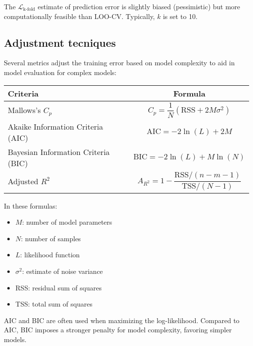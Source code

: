 The $\mathcal{L}_{\text{k-fold}}$ estimate of prediction error is slightly biased (pessimistic) but more computationally feasible than LOO-CV. 
Typically, $k$ is set to 10.

\subsection{Adjustment tecniques}
Several metrics adjust the training error based on model complexity to aid in model evaluation for complex models:
\renewcommand*{\arraystretch}{2}
\begin{table}[H]
    \centering
    \begin{tabular}{|l|c|}
        \hline
        \textbf{Criteria} & \textbf{Formula} \\ \hline
        Mallows's $C_p$ & $C_p=\dfrac{1}{N}\left( \text{RSS}+2M\sigma^2 \right)$ \\ \hline
        Akaike Information Criteria (AIC) & $\text{AIC}=-2\ln(L)+2M$ \\ \hline
        Bayesian Information Criteria (BIC) & $\text{BIC}=-2\ln(L)+M\ln(N)$ \\ \hline
        Adjusted $R^2$ & $A_{R^2}=1-\dfrac{\text{RSS}/(n-m-1)}{\text{TSS}/(N-1)}$ \\ \hline
    \end{tabular}
\end{table}
\renewcommand*{\arraystretch}{1}
In these formulas:
\begin{itemize}
    \item $M$: number of model parameters
    \item $N$: number of samples
    \item $L$: likelihood function
    \item $\sigma^2$: estimate of noise variance
    \item RSS: residual sum of squares
    \item TSS: total sum of squares
\end{itemize}
AIC and BIC are often used when maximizing the log-likelihood. 
Compared to AIC, BIC imposes a stronger penalty for model complexity, favoring simpler models.